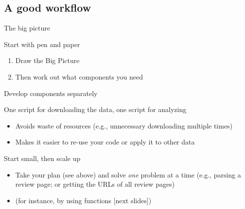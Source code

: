 \documentclass[compress]{beamer}
\begin{document}
\begin{frame}[plain]
\end{frame}

\subsection{A good workflow}




\begin{frame}{The big picture}
	\begin{block}{Start with pen and paper}
		\begin{enumerate}[<+->]
			\item Draw the Big Picture
			\item Then work out what components you need
		\end{enumerate}
	\end{block}
\end{frame}




\begin{frame}{Develop components separately}
	\begin{block}{One script for downloading the data, one script for analyzing}
		\begin{itemize}[<+->]
			\item Avoids waste of resources (e.g., unnecessary downloading multiple times)
			\item Makes it easier to re-use your code or apply it to other data
		\end{itemize}
	\end{block}
	\pause
	\begin{block}{Start small, then scale up}
		\begin{itemize}[<+->]
			\item Take your plan (see above) and solve \textit{one} problem at a time (e.g., parsing a review page; or getting the URLs of all review pages)
			\item (for instance, by using functions [next slides])
		\end{itemize}
	\end{block}
	
\end{frame}	
\end{document}
